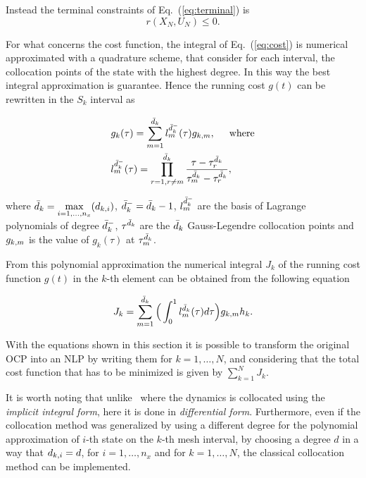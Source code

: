 Instead the terminal constraints of Eq.~(\ref{eq:terminal}) is
\begin{equation}\label{eq:npterminal}
	r(X_N, U_N) \leq 0.
\end{equation}

For what concerns the cost function, the integral of Eq.~(\ref{eq:cost}) is numerical approximated with a quadrature scheme, that consider for each interval, the collocation points of the state with the highest degree. In this way the best integral approximation is guarantee. Hence the running cost $g(t)$ can be rewritten in the $S_k$ interval as

\begin{subequations}
	\begin{align}
	& g_k(\tau) = \sum_{m=1}^{\bar{d}_k} l_{m}^{\bar{d}_{k}^{-}}(\tau)g_{k,m}, \hspace{5mm} \text{where} \label{eq:nlpcost}\\
	&  l_{m}^{\bar{d}_{k}^{-}} (\tau) = \prod_{r=1, r\neq m}^{\bar{d}_k} \dfrac{\tau - \tau^{\bar{d}_{k}}_{r}}{\tau^{\bar{d}_{k}}_{m} - \tau^{\bar{d}_{k}}_{r}}, \label{eq:nlplm}
	\end{align}
\end{subequations}

where $\bar{d}_k = \max\limits_{i= 1, \dots, n_x}(d_{k,i})$, $\bar{d}_k^{-} = \bar{d}_k -1$, $l_{m}^{\bar{d}_{k}^{-}}$ are the basis of Lagrange polynomials of degree $\bar{d}_k^{-}$, $\tau^{\bar{d}_{k}}$ are the $\bar{d}_k$ Gauss-Legendre collocation points and $g_{k,m}$ is the value of $g_k (\tau)$ at $\tau^{\bar{d}_{k}}_{m}$.

From this polynomial approximation the numerical integral $J_k$ of the running cost function $g(t)$ in the $k$-th element can be obtained from the following equation

\begin{equation}\label{eq:nlpcostk}
	J_k = \sum_{m=1}^{\bar{d}_k}\Big(\int_{0}^{1}l_{m}^{\bar{d}_{k}}(\tau)d\tau\Big)g_{k,m} h_{k}.
\end{equation}

With the equations shown in this section it is possible to transform the original OCP into an NLP by writing them for $k = 1, \dots, N$, and considering that the total cost function that has to be minimized is given by $\sum_{k=1}^{N}J_k$.

It is worth noting that unlike~\cite{Patterson:OCAM:2015} where the dynamics is collocated using the \emph{implicit integral form}, here it is done in \emph{differential form}.
Furthermore, even if the collocation method was generalized by using a different degree for the polynomial approximation of $i$-th state on the $k$-th mesh interval, by choosing a degree $d$ in a way that $d_{k,i} = d$, for $i = 1, \dots, n_x$ and for $k = 1, \dots, N$, the classical collocation method can be implemented.
